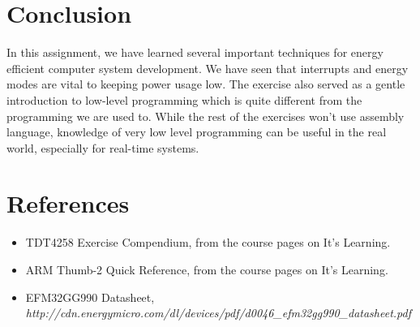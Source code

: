\documentclass[a4paper, 12pt]{article}
\begin{document}
\section{Conclusion} %
\label{sec:conclusion}
    In this assignment, we have learned several important techniques for energy efficient computer system development. We have seen that interrupts and energy modes are vital to keeping power usage low. The exercise also served as a gentle introduction to low-level programming which is quite different from the programming we are used to. While the rest of the exercises won't use assembly language, knowledge of very low level programming can be useful in the real world, especially for real-time systems.

\section{References} %
\label{sec:references}
    \begin{itemize}
        \item TDT4258 Exercise Compendium, from the course pages on It's Learning.
        \item ARM Thumb-2 Quick Reference, from the course pages on It's Learning.
        \item EFM32GG990 Datasheet, \\
		\textit{http://cdn.energymicro.com/dl/devices/pdf/d0046\_efm32gg990\_datasheet.pdf}
    \end{itemize}
\end{document}

